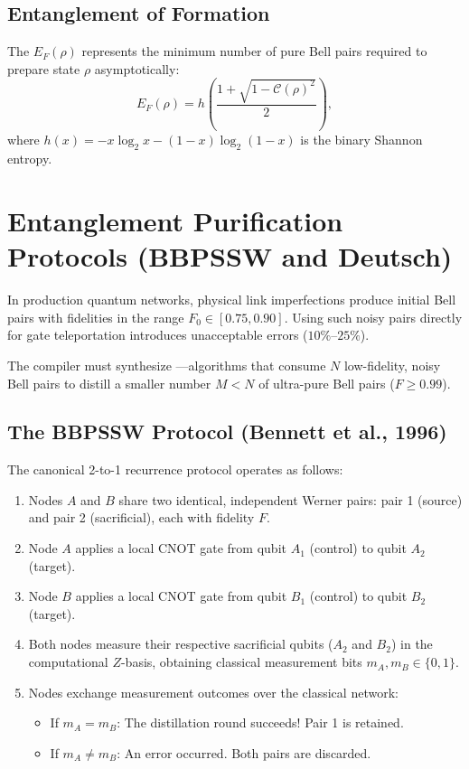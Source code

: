 \subsection{Entanglement of Formation}
The  $E_F(\rho)$ represents the minimum number of pure Bell pairs required to prepare state $\rho$ asymptotically:
\begin{equation}
    E_F(\rho) = h\left( \frac{1 + \sqrt{1 - \mathcal{C}(\rho)^2}}{2} \right),
\end{equation}
where $h(x) = -x \log_2 x - (1 - x) \log_2(1 - x)$ is the binary Shannon entropy.

\section{Entanglement Purification Protocols (BBPSSW and Deutsch)}
\label{sec:entanglement_purification}

In production quantum networks, physical link imperfections produce initial Bell pairs with fidelities in the range $F_0 \in [0.75, 0.90]$. Using such noisy pairs directly for gate teleportation introduces unacceptable errors ($10\%\text{--}25\%$).

The compiler must synthesize ---algorithms that consume $N$ low-fidelity, noisy Bell pairs to distill a smaller number $M < N$ of ultra-pure Bell pairs ($F \ge 0.99$).

\subsection{The BBPSSW Protocol (Bennett et al., 1996)}
The canonical 2-to-1 recurrence protocol operates as follows:
\begin{enumerate}
    \item Nodes $A$ and $B$ share two identical, independent Werner pairs: pair 1 (source) and pair 2 (sacrificial), each with fidelity $F$.
    \item Node $A$ applies a local CNOT gate from qubit $A_1$ (control) to qubit $A_2$ (target).
    \item Node $B$ applies a local CNOT gate from qubit $B_1$ (control) to qubit $B_2$ (target).
    \item Both nodes measure their respective sacrificial qubits ($A_2$ and $B_2$) in the computational $Z$-basis, obtaining classical measurement bits $m_A, m_B \in \{0, 1\}$.
    \item Nodes exchange measurement outcomes over the classical network:
    \begin{itemize}
        \item If $m_A = m_B$: The distillation round succeeds! Pair 1 is retained.
        \item If $m_A \neq m_B$: An error occurred. Both pairs are discarded.
    \end{itemize}
\end{enumerate}

